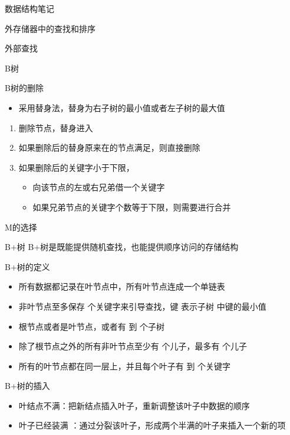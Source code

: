 \documentclass[
  ignorenonframetext,
]{beamer}
\providecommand{\tightlist}{%
  \setlength{\itemsep}{0pt}\setlength{\parskip}{0pt}}
\begin{document}
\begin{frame}[fragile]{数据结构笔记}
\begin{block}{外存储器中的查找和排序}
\begin{block}{外部查找}
\begin{block}{B树}
\begin{block}{B树的删除}
\protect{}\label{bux6811ux7684ux5220ux9664}
\begin{itemize}
\tightlist
\item
  采用替身法，替身为右子树的最小值或者左子树的最大值
\end{itemize}

\begin{enumerate}
\tightlist
\item
  删除节点，替身进入
\item
  如果删除后的替身原来在的节点满足，则直接删除
\item
  如果删除后的关键字小于下限，

  \begin{itemize}
  \tightlist
  \item
    向该节点的左或右兄弟借一个关键字
  \item
    如果兄弟节点的关键字个数等于下限，则需要进行合并
  \end{itemize}
\end{enumerate}
\end{block}

\begin{block}{M的选择}
\protect{}\label{mux7684ux9009ux62e9}
\end{block}
\end{block}

\begin{block}{B+树}
\protect{}\label{bux6811-1}
B+树是既能提供随机查找，也能提供顺序访问的存储结构

\begin{block}{B+树的定义}
\protect{}\label{bux6811ux7684ux5b9aux4e49-1}
\begin{itemize}
\tightlist
\item
  所有数据都记录在叶节点中，所有叶节点连成一个单链表
\item
  非叶节点至多保存 {} 个关键字来引导查找，键 {} 表示子树 {} 中键的最小值
\item
  根节点或者是叶节点，或者有 {} 到 {} 个子树
\item
  除了根节点之外的所有非叶节点至少有 {} 个儿子，最多有 {} 个儿子
\item
  所有的叶节点都在同一层上，并且每个叶子有 {} 到 {} 个关键字
\end{itemize}
\end{block}

\begin{block}{B+树的插入}
\protect{}\label{bux6811ux7684ux63d2ux5165-1}
\begin{itemize}
\tightlist
\item
  叶结点不满：把新结点插入叶子，重新调整该叶子中数据的顺序
\item
  叶子已经装满 ：通过分裂该叶子，形成两个半满的叶子来插入一个新的项


\end{itemize}
\end{block}
\end{block}
\end{block}
\end{block}
\end{frame}
\end{document}
